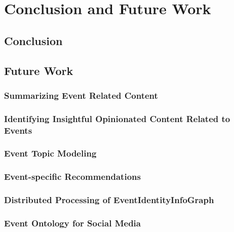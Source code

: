 
\chapter{Conclusion and Future Work} %

\label{Conclusion} %


\section{Conclusion}

\section{Future Work}

\subsection{Summarizing Event Related Content}

\subsection{Identifying Insightful Opinionated Content Related to Events}

\subsection{Event Topic Modeling}

\subsection{Event-specific Recommendations}

\subsection{Distributed Processing of EventIdentityInfoGraph}

\subsection{Event Ontology for Social Media}